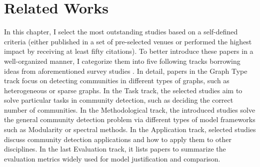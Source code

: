 \chapter{Related Works}  \label{ch:review}

In this chapter, I select the most outstanding studies based on a self-defined criteria (either published in a set of pre-selected venues or performed the highest impact by receiving at least fifty citations). To better introduce these papers in a well-organized manner, I categorize them into five following tracks borrowing ideas from aforementioned survey studies \cite{fortunato2010community, fortunato2016community, coscia2011classification}. In detail, papers in the Graph Type track focus on detecting communities in different types of graphs, such as heterogeneous or sparse graphs. In the Task track, the selected studies aim to solve particular tasks in community detection, such as deciding the correct number of communities. In the Methodological track, the introduced studies solve the general community detection problem via different types of model frameworks such as Modularity or spectral methods. In the Application track, selected studies discuss community detection applications and how to apply them to other disciplines. In the last Evaluation track, it lists papers to summarize the evaluation metrics widely used for model justification and comparison. 







